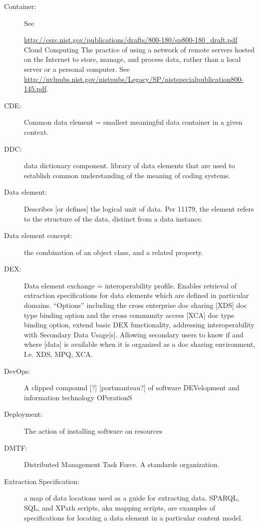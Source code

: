 \begin{description}
\item[Container:]	See

\url{http://csrc.nist.gov/publications/drafts/800-180/sp800-180_draft.pdf}
Cloud Computing	The practice of using a network of remote servers hosted on the Internet to store, manage, and process data, rather than a local server or a personal computer. See \url{http://nvlpubs.nist.gov/nistpubs/Legacy/SP/nistspecialpublication800-145.pdf}.

\item[CDE:] 	Common data element = smallest meaningful data container in a given context.  

\item[DDC:]	data dictionary component. library of data elements that are used to establish common understanding of the meaning of coding systems.

\item[Data element:]	Describes [or defines] the logical unit of data. Per 11179, the element refers to the structure of the data, distinct from a data instance. 

\item[Data element concept:]	the combination of an object class, and a related property. 

\item[DEX:] 	Data element exchange = interoperability profile. Enables retrieval of extraction specifications for data elements which are defined in particular domains. “Options” including the cross enterprise doc sharing [XDS] doc type binding option and the cross community access [XCA] doc type binding option, extend basic DEX functionality, addressing interoperability with Secondary Data Usage[s]. Allowing secondary users to know if and where [data] is available when it is organized as a doc sharing environment, I.e. XDS, MPQ, XCA. 

\item[DevOps:]	A clipped compound [?] [portmanteau?] of software DEVelopment and information technology OPerationS

\item[Deployment:]	The action of installing software on resources

\item[DMTF:]   Distributed Management Task Force. A standards organization.

\item[Extraction Specification:]	a map of data locations used as a guide for extracting data. SPARQL, SQL, and XPath scripts, aka mapping scripts, are examples of specifications for locating a data element in a particular content model. 


\end{description}
